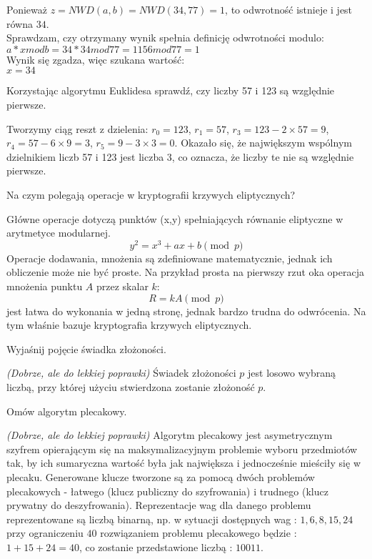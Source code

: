 \documentclass[answers,11pt]{exam}
\newcommand{\fixit}{\textit{(Dobrze, ale do lekkiej poprawki)} }
\begin{document}
\begin{questions}
\begin{solution}
Ponieważ $z = NWD(a,b) = NWD(34,77) = 1$, to odwrotność istnieje i jest równa $34$.\\

Sprawdzam, czy otrzymany wynik spełnia definicję odwrotności modulo:\\
$a * x mod b = 34 * 34 mod 77 = 1156 mod 77 = 1$\\

Wynik się zgadza, więc szukana wartość:\\
$x = 34$
\end{solution}

\question Korzystając algorytmu Euklidesa sprawdź, czy liczby 57 i 123 są względnie pierwsze.
\begin{solution}
Tworzymy ciąg reszt z dzielenia:
$r_0 = 123$, $r_1 = 57$, $r_3 = 123 - 2 \times 57 = 9$, $r_4 = 57 - 6 \times 9 = 3$, 
$r_5 = 9 - 3 \times 3 = 0$. Okazało się, że największym wspólnym dzielnikiem liczb 57 i 123 jest liczba 3, co oznacza, że liczby te nie są względnie pierwsze.
\end{solution}

\question Na czym polegają operacje w kryptografii krzywych eliptycznych?
\begin{solution}
Główne operacje dotyczą punktów (x,y) spełniających równanie eliptyczne w arytmetyce modularnej. 
\begin{equation}
y^2 = x^3 + ax +b \pmod{p}
\end{equation}
Operacje dodawania, mnożenia są zdefiniowane matematycznie, jednak ich obliczenie może nie być proste. Na przykład prosta na pierwszy rzut oka operacja mnożenia punktu $A$ przez skalar $k$:
\begin{equation}
R = k A \pmod{p}
\end{equation}
jest łatwa do wykonania w jedną stronę, jednak bardzo trudna do odwrócenia. Na tym właśnie bazuje kryptografia krzywych eliptycznych.

\end{solution}

\question Wyjaśnij pojęcie świadka złożoności.
\begin{solution}
\fixit
Świadek złożoności $p$ jest losowo wybraną liczbą, przy której użyciu stwierdzona zostanie złożoność $p$.
\end{solution}

\question Omów algorytm plecakowy.
\begin{solution}
\fixit
Algorytm plecakowy jest asymetrycznym szyfrem opierającym się na maksymalizacyjnym problemie wyboru przedmiotów tak, by ich sumaryczna wartość była jak największa i jednocześnie mieściły się w plecaku. Generowane klucze tworzone są za pomocą dwóch problemów plecakowych - łatwego (klucz publiczny do szyfrowania) i trudnego (klucz prywatny do deszyfrowania). Reprezentacje wag dla danego problemu reprezentowane są liczbą binarną, np. w sytuacji dostępnych wag : $1, 6, 8, 15, 24$ przy ograniczeniu $40$ rozwiązaniem problemu plecakowego będzie : $1+15+24 = 40$, co zostanie przedstawione liczbą : $10011$.
\end{solution}

\end{questions}
\end{document}
